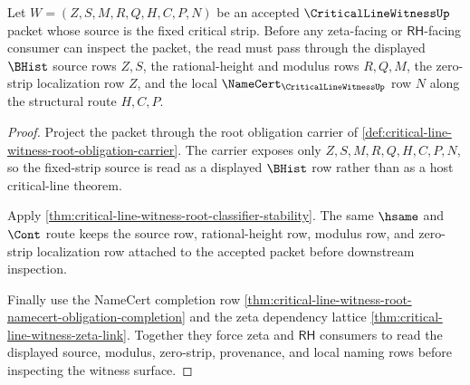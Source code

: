 \begin{theorem}
\label{thm:critical-line-witness-fixed-strip-source-readback-totality}
Let $W=(Z,S,M,R,Q,H,C,P,N)$ be an accepted
$\CriticalLineWitnessUp$ packet whose source is the fixed critical strip.
Before any zeta-facing or $\mathsf{RH}$-facing consumer can inspect the
packet, the read must pass through the displayed $\BHist$ source rows $Z,S$,
the rational-height and modulus rows $R,Q,M$, the zero-strip localization
row $Z$, and the local $\NameCert_{\CriticalLineWitnessUp}$ row $N$ along
the structural route $H,C,P$.
\end{theorem}
\begin{proof}
Project the packet through the root obligation carrier of
\autoref{def:critical-line-witness-root-obligation-carrier}. The carrier
exposes only $Z,S,M,R,Q,H,C,P,N$, so the fixed-strip source is read as a
displayed $\BHist$ row rather than as a host critical-line theorem.

Apply \autoref{thm:critical-line-witness-root-classifier-stability}. The
same $\hsame$ and $\Cont$ route keeps the source row, rational-height row,
modulus row, and zero-strip localization row attached to the accepted packet
before downstream inspection.

Finally use the NameCert completion row
\autoref{thm:critical-line-witness-root-namecert-obligation-completion} and
the zeta dependency lattice \autoref{thm:critical-line-witness-zeta-link}.
Together they force zeta and $\mathsf{RH}$ consumers to read the displayed
source, modulus, zero-strip, provenance, and local naming rows before
inspecting the witness surface.
\end{proof}

